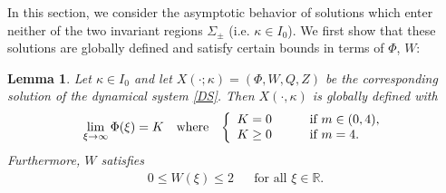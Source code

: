 \documentclass{article}%
\newtheorem{lemma}[theorem]{Lemma}
\newenvironment{TC} {\left \{\begin{array}{ll}} {\end{array} \right.}
\newcommand{\kap}{\kappa}
\newcommand{\R}{\mathbb{R}}
\begin{document}
In this section, we consider the asymptotic behavior of solutions which enter 
neither of the two invariant regions $\Sigma_\pm$ (i.e. $\kap \in I_0$). We 
first show that these solutions are globally defined and satisfy certain bounds 
in terms of $\Phi$, $W$:
\begin{lemma} \label{lem-lim1} %
Let $\kappa\in I_{0}$ and let $X(\cdot;\kappa) = (\Phi,W,Q,Z)$ be the corresponding 
solution of the dynamical system \eqref{DS}. Then $X(\cdot, \kap)$ is globally defined with
  \begin{align}\label{limit1}
    \lim_{\xi \to \infty}\Phi(\xi) = K %
    &&\text{where} \quad
       \begin{TC}
         K = 0 \qquad &\text{if $m \in (0,4)$,} \\
         K \geq 0 &\text{if $m=4$}. 
       \end{TC}
  \end{align}
  Furthermore, $W$ satisfies
\begin{align} \label{limit2} %
    0 \leq W(\xi) \leq 2 && \text{for all $\xi \in \R$.}
\end{align}
\end{lemma}
\end{document}
